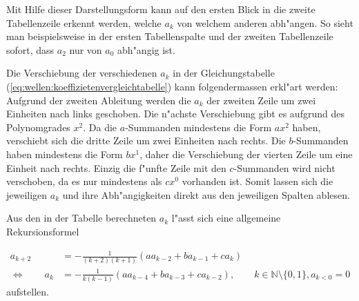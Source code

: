 Mit Hilfe dieser Darstellungsform kann auf den ersten Blick in die zweite 
Tabellenzeile erkennt werden, welche $a_k$ von welchem anderen abh"angen. So 
sieht man beispielsweise in der ersten Tabellenspalte und der zweiten 
Tabellenzeile sofort, dass $a_2$ nur von $a_0$ abh"angig ist.

Die Verschiebung der verschiedenen $a_k$ in der Gleichungstabelle 
(\ref{eq:wellen:koeffizietenvergleichtabelle}) kann folgendermassen erkl"art 
werden: Aufgrund der zweiten Ableitung werden die $a_k$ der zweiten Zeile um 
zwei Einheiten nach links geschoben. Die n"achste Verschiebung gibt es aufgrund 
des Polynomgrades $x^2$. Da die $a$-Summanden mindestens die Form $ax^2$ haben, 
verschiebt sich die dritte Zeile um zwei Einheiten nach rechts. Die 
$b$-Summanden haben mindestens die Form $bx^1$, daher die Verschiebung der 
vierten Zeile um eine Einheit nach rechts. Einzig die f"unfte Zeile mit den 
$c$-Summanden wird nicht verschoben, da es nur mindestens als $cx^0$ vorhanden 
ist. Somit lassen sich die jeweiligen $a_k$ und 
ihre Abh"angigkeiten direkt aus den jeweiligen Spalten ablesen.

Aus den in der Tabelle berechneten $a_k$ l"asst sich eine allgemeine 
Rekursionsformel

\begin{equation*}
	\begin{split}
		a_{k+2} &= -\frac{1}{(k+2)(k+1)} (aa_{k-2}+ba_{k-1}+ca_k) \\
		\Leftrightarrow \qquad
		a_k &= -\frac{1}{k(k-1)} (aa_{k-4}+ba_{k-3}+ca_{k-2}), \qquad k \in 
		\mathbb{N} \setminus \{0, 1\}, a_{k<0} = 0
	\end{split}
\end{equation*}
aufstellen.